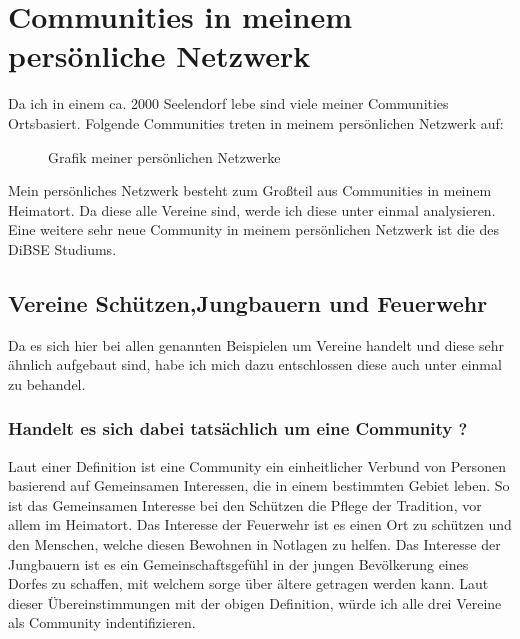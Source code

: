 \documentclass[12pt]{article}
\begin{document}
\section{Communities in meinem persönliche Netzwerk}
Da ich in einem ca. 2000 Seelendorf lebe sind viele meiner Communities Ortsbasiert. Folgende Communities treten in meinem persönlichen Netzwerk auf:
\begin{figure}[H]
\begin{center}
\end{center}
\caption{Grafik meiner persönlichen Netzwerke}
\label{fig:communities}
\end{figure}
\flushleft Mein persönliches Netzwerk besteht zum Großteil aus Communities in meinem Heimatort. Da diese alle Vereine sind, werde ich diese unter einmal analysieren. Eine weitere sehr neue Community in meinem persönlichen Netzwerk ist die des DiBSE Studiums.
\pagebreak
\subsection{Vereine Schützen,Jungbauern und Feuerwehr}
Da es sich hier bei allen genannten Beispielen um Vereine handelt und diese sehr ähnlich aufgebaut sind, habe ich mich dazu entschlossen diese auch unter einmal zu behandel.
\subsubsection{Handelt es sich dabei tatsächlich um eine Community ?}
Laut einer Definition ist eine Community ein einheitlicher Verbund von Personen basierend auf Gemeinsamen Interessen, die in einem bestimmten Gebiet leben. So ist das Gemeinsamen Interesse bei den Schützen die Pflege der Tradition, vor allem im Heimatort. Das Interesse der Feuerwehr ist es einen Ort zu schützen und den Menschen, welche diesen Bewohnen in Notlagen zu helfen. Das Interesse der Jungbauern ist es ein Gemeinschaftsgefühl in der jungen Bevölkerung eines Dorfes zu schaffen, mit welchem sorge über ältere getragen werden kann. Laut dieser Übereinstimmungen mit der obigen Definition, würde ich alle drei Vereine als Community indentifizieren.
\end{document}
